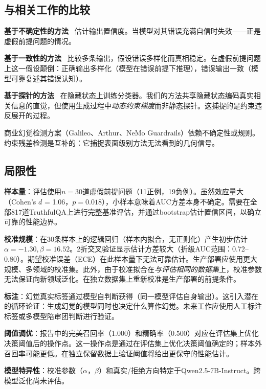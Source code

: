 \documentclass[11pt]{ctexart}
\begin{document}
\subsection{与相关工作的比较}

\textbf{基于不确定性的方法}~\cite{kadavath2022language,kuhn2023semantic} 估计输出置信度。当模型对其错误充满自信时失效——正是虚假前提问题的情况。

\textbf{基于一致性的方法}~\cite{manakul2023selfcheckgpt} 比较多条输出，假设错误多样化而真相稳定。在虚假前提问题上这一假设颠倒：正确输出多样化（模型在错误前提下推理），错误输出一致（模型可靠复述其错误认知）。

\textbf{基于探针的方法}~\cite{burns2022discovering,azaria2023internal} 在隐藏状态上训练分类器。我们的方法共享隐藏状态编码真实相关信息的直觉，但使用生成过程中\textit{动态约束梯度}而非静态探针。这捕捉的是约束违反展开的过程。

商业幻觉检测方案（Galileo、Arthur、NeMo Guardrails）依赖不确定性或规则。约束残差检测是互补的：它捕捉表面级别方法无法看到的几何信号。

\subsection{局限性}

\textbf{样本量}：评估使用$n = 30$道虚假前提问题（11正例，19负例）。虽然效应量大（Cohen's $d$ = 1.06，$p = 0.018$），小样本意味着AUC方差本身不确定。需要在全部817道TruthfulQA上进行完整基准评估，并通过bootstrap估计置信区间，以确立可靠的性能边界。

\textbf{校准规模}：在30条样本上的逻辑回归（样本内拟合，无正则化）产生初步估计$\alpha=-1.30, \beta=16.52$。2折交叉验证显示估计方差较大（折级AUC范围：0.72--0.80）。期望校准误差（ECE）在此样本量下无法可靠估计。生产部署应使用更大规模、多领域的校准集。此外，由于校准拟合在\textit{与评估相同的数据集}上，校准参数无法保证向新领域泛化。在独立数据集上重新校准是生产部署的前提条件。

\textbf{标注}：幻觉真实标签通过模型自判断获得（同一模型评估自身输出）。这引入潜在的循环论证：生成幻觉的模型同时也决定什么算作幻觉。未来工作应使用人工标注标签或多模型陪审团判断进行验证。

\textbf{阈值调优}：报告中的完美召回率（1.000）和精确率（0.500）对应在评估集上优化决策阈值后的操作点。这一操作点是通过在评估集上优化决策阈值确定的；样本外召回率可能更低。在独立保留数据上验证阈值将给出更保守的性能估计。

\textbf{模型特异性}：校准参数（$\alpha$，$\beta$）和真实/拒绝方向特定于Qwen2.5-7B-Instruct。跨模型泛化尚未评估。
\end{document}
